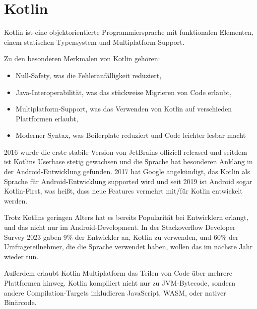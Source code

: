 
\chapter{Kotlin}\label{ch:kotlin}

Kotlin ist eine objektorientierte Programmiersprache mit funktionalen Elementen, einem statischen Typensystem und
Multiplatform-Support.

Zu den besonderen Merkmalen von Kotlin gehören:
\begin{itemize}
    \item Null-Safety, was die Fehleranfälligkeit reduziert,
    \item Java-Interoperabilität, was das stückweise Migrieren von Code erlaubt,
    \item Multiplatform-Support, was das Verwenden von Kotlin auf verschieden Plattformen erlaubt,
    \item Moderner Syntax, was Boilerplate reduziert und Code leichter lesbar macht
\end{itemize}

2016 wurde die erste stabile Version von JetBrains offiziell released und seitdem ist Kotlins Userbase
stetig gewachsen und die Sprache hat besonderen Anklang in der Android-Entwicklung gefunden.
2017 hat Google angekündigt, das Kotlin als Sprache für Android-Entwicklung supported wird und seit 2019 ist Android
sogar Kotlin-First, was heißt, dass neue Features vermehrt mit/für Kotlin entwickelt werden.

Trotz Kotlins geringen Alters hat es bereits Popularität bei Entwicklern erlangt, und das nicht nur im
Android-Development.
In der Stackoverflow Developer Survey 2023 gaben 9\% der Entwickler an, Kotlin zu verwenden, und 60\% der
Umfrageteilnehmer, die die Sprache verwendet haben, wollen das im nächste Jahr wieder tun.

Außerdem erlaubt Kotlin Multiplatform das Teilen von Code über mehrere Plattformen hinweg.
Kotlin kompiliert nicht nur zu JVM-Bytecode, sondern andere Compilation-Targets inkludieren JavaScript, WASM, oder
nativer Binärcode.\cite{androidDevKotlinFirst, kspecIntroduction, soDevSurvey23, kMediaKit}









